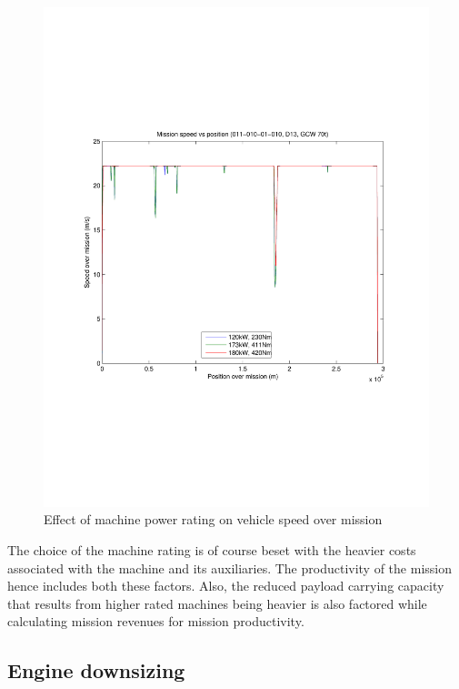 \documentclass{article}
\begin{document}
\begin{figure}[h!]
\centering
\includegraphics[width=\linewidth, clip=true, trim=45 185 65 208]{Figures/Effect_of_machine_power_rating/Mission_speed_vs_position_(011-010-01-010,D13,GCW_70t).pdf}
\caption{Effect of machine power rating on vehicle speed over mission}
\label{speedMissionMachineRating}
\end{figure}

The choice of the machine rating is of course beset with the heavier costs associated with the machine and its auxiliaries. The productivity of the mission hence includes both these factors. Also, the reduced payload carrying capacity that results from higher rated machines being heavier is also factored while calculating mission revenues for mission productivity.\\

\subsection{Engine downsizing}
\end{document}
